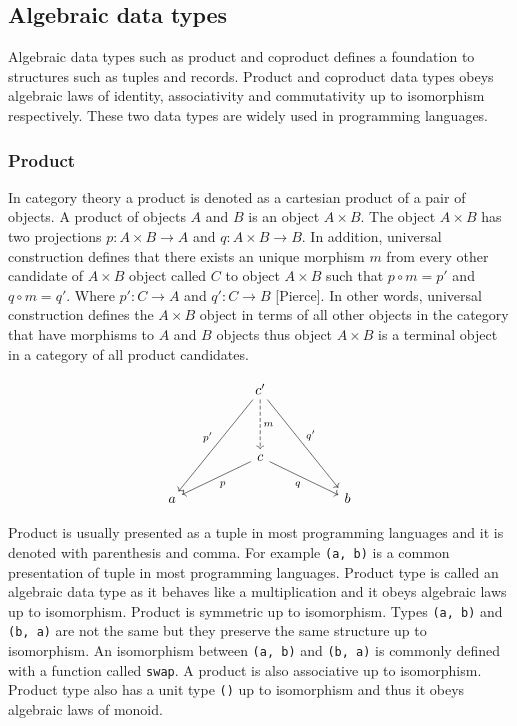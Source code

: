 \documentclass[article]{aaltoseries}
\begin{document}

  \subsection{Algebraic data types}
    Algebraic data types such as product and coproduct defines a foundation to
    structures such as tuples and records. Product and coproduct data types
    obeys algebraic laws of identity, associativity and commutativity up to
    isomorphism respectively. These two data types are widely used in
    programming languages.


  \subsubsection{Product}
    In category theory a product is denoted as a cartesian product of a pair of
    objects. A product of objects $A$ and $B$ is an object $A \times B$. The
    object $A \times B$ has two projections $p : A \times B \rightarrow A$ and
    $q : A \times B \rightarrow B$. In addition, universal construction defines
    that there exists an unique morphism $m$ from every other candidate of $A
    \times B$ object called $C$ to object $A \times B$ such that $p \circ m =
    p'$ and $q \circ m = q'$. Where $p' : C \rightarrow A$ and $q' : C
    \rightarrow B$ [Pierce]. In other words, universal construction defines the
    $A \times B$ object in terms of all other objects in the category that have
    morphisms to $A$ and $B$ objects thus object $A \times B$ is a terminal
    object in a category of all product candidates.  

    \[
      \begin{tikzcd}[row sep=huge, column sep=huge]
        & c' \arrow[d, dashed, "m"]
        \arrow[ddl, "p'"']
        \arrow[ddr, "q'"]
        & \\
        & c \arrow[dl, "p"]
        \arrow[dr, "q"']
        & \\
        [-2em] a
        &
        & b
      \end{tikzcd}
    \]

    Product is usually presented as a tuple in most programming languages and it
    is denoted with parenthesis and comma. For example \lstinline|(a, b)| is a
    common presentation of tuple in most programming languages. Product type is
    called an algebraic data type as it behaves like a multiplication and it
    obeys algebraic laws up to isomorphism. Product is symmetric up to
    isomorphism. Types \lstinline|(a, b)| and \lstinline|(b, a)| are not the
    same but they preserve the same structure up to isomorphism. An isomorphism
    between \lstinline|(a, b)| and \lstinline|(b, a)| is commonly defined with a
    function called \lstinline|swap|. A product is also associative up to
    isomorphism. Product type also has a unit type \lstinline|()| up to
    isomorphism and thus it obeys algebraic laws of monoid.
\end{document}
